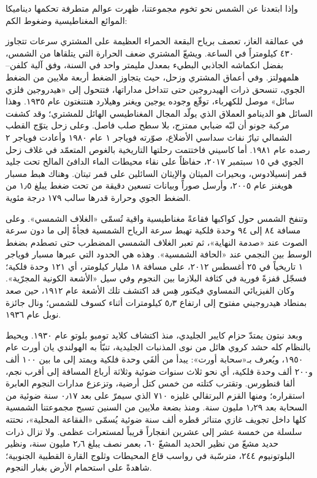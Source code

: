 \documentclass[12pt,a4paper,openany]{book}
\begin{document}
وإذا ابتعدنا عن الشمس نحو تخوم مجموعتنا، ظهرت عوالم متطرفة تحكمها ديناميكا الموائع المغناطيسية وضغوط الكم:


في عمالقة الغاز، تعصف برياح البقعة الحمراء العظيمة على المشتري سرعات تتجاوز ٤٣٠ كيلومتراً في الساعة. ويشعّ المشتري ضعف الحرارة التي يتلقاها من الشمس، بفضل انكماشه الجاذبي البطيء بمعدل مليمتر واحد في السنة، وفق آلية كلفن–هلمهولتز. وفي أعماق المشتري وزحل، حيث يتجاوز الضغط أربعة ملايين من الضغط الجوي، تنسحق ذرات الهيدروجين حتى تتداخل مداراتها، فتتحول إلى «هيدروجين فلزي سائل» موصل للكهرباء، توقّع وجوده يوجين ويغنر وهيلارد هنتنغتون عام ١٩٣٥. وهذا السائل هو الدينامو العملاق الذي يولّد المجال المغناطيسي الهائل للمشتري؛ وقد كشفت مركبة جونو أن لبّه ضبابي ممتزج، بلا سطح صلب فاصل. وعلى زحل يتوّج القطب الشمالي تيارٌ نفاث سداسي الأضلاع، صوّرته فوياجر ١ عام ١٩٨٠ وأعادت فوياجر ٢ رصده عام ١٩٨١. أما كاسيني فاختتمت رحلتها التاريخية بالغوص المتعمّد في غلاف زحل الجوي في ١٥ سبتمبر ٢٠١٧، حفاظاً على نقاء محيطات الماء الدافئ المالح تحت جليد قمر إنسيلادوس، وبحيرات الميثان والإيثان السائلين على قمر تيتان. وهناك هبط مسبار هويغنز عام ٢٠٠٥، وأرسل صوراً وبيانات تسعين دقيقة من تحت ضغط يبلغ ١٫٥ من الضغط الجوي وحرارة قدرها سالب ١٧٩ درجة مئوية.


وتنفخ الشمس حول كواكبها فقاعةً مغناطيسية واقية تُسمّى «الغلاف الشمسي». وعلى مسافة ٨٤ إلى ٩٤ وحدة فلكية تهبط سرعة الرياح الشمسية فجأةً إلى ما دون سرعة الصوت عند «صدمة النهاية»، ثم تعبر الغلاف الشمسي المضطرب حتى تصطدم بضغط الوسط بين النجمي عند «الحافة الشمسية». وهذه هي الحدود التي عبرها مسبار فوياجر ١ تاريخياً في ٢٥ أغسطس ٢٠١٢، على مسافة ١٨ مليار كيلومتر، أي ١٢١ وحدة فلكية؛ فسجّل قفزةً فورية في كثافة البلازما بين النجوم وفي سيل «الأشعة الكونية المجرّية». وكان الفيزيائي النمساوي فيكتور هِس قد اكتشف تلك الأشعة عام ١٩١٢، حين صعد بمنطاد هيدروجيني مفتوح إلى ارتفاع ٥٫٣ كيلومترات أثناء كسوف للشمس؛ ونال جائزة نوبل عام ١٩٣٦.


وبعد نبتون يمتدّ حزام كايبر الجليدي، منذ اكتشاف كلايد تومبو بلوتو عام ١٩٣٠. ويحيط بالنظام كله حشد كروي هائل من نوى المذنبات الجليدية، تنبّأ به الهولندي يان أورت عام ١٩٥٠، ويُعرف بـ«سحابة أورت»: يبدأ من ألفَي وحدة فلكية ويمتد إلى ما بين ١٠٠ ألف و٢٠٠ ألف وحدة فلكية، أي نحو ثلاث سنوات ضوئية وثلاثة أرباع المسافة إلى أقرب نجم، ألفا قنطورس. وتقترب كتلته من خمس كتل أرضية، وتزعزع مدارات النجوم العابرة استقراره؛ ومنها القزم البرتقالي غليزه ٧١٠ الذي سيمرّ على بعد ٠٫١٧ سنة ضوئية من السحابة بعد ١٫٢٩ مليون سنة. ومنذ بضعة ملايين من السنين تسبح مجموعتنا الشمسية كلها داخل تجويف غازي متناثر قطره ألف سنة ضوئية يُسمّى «الفقاعة المحلية»، نحتته سلسلة من خمسة عشر إلى عشرين انفجاراً قريباً لمستعرات عظمى. ولا تزال ذرات حديد مشعّ من نظير الحديد المشعّ ٦٠، بعمر نصف يبلغ ٢٫٦ مليون سنة، ونظير البلوتونيوم ٢٤٤، مترسّبة في رواسب قاع المحيطات وثلوج القارة القطبية الجنوبية؛ شاهدةً على استحمام الأرض بغبار النجوم.
\end{document}
